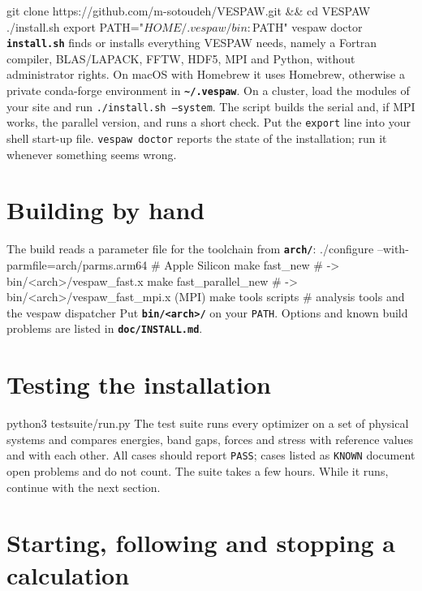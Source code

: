 \documentclass[11pt,a4paper,oneside]{book}
\newcommand{\file}[1]{\textbf{\texttt{#1}}}
\newenvironment{shell}{\small\verbatim}{\endverbatim}
\begin{document}
\begin{shell}
git clone https://github.com/m-sotoudeh/VESPAW.git && cd VESPAW
./install.sh
export PATH="$HOME/.vespaw/bin:$PATH"
vespaw doctor
\end{shell}
\file{install.sh} finds or installs everything VESPAW needs, namely a
Fortran compiler, BLAS/LAPACK, FFTW, HDF5, MPI and Python, without
administrator rights. On macOS with Homebrew it uses Homebrew, otherwise
a private conda-forge environment in \file{\textasciitilde/.vespaw}. On
a cluster, load the modules of your site and run
\texttt{./install.sh --system}. The script builds the serial and, if MPI
works, the parallel version, and runs a short check. Put the
\texttt{export} line into your shell start-up file. \texttt{vespaw
doctor} reports the state of the installation; run it whenever
something seems wrong.

\section{Building by hand}

The build reads a parameter file for the toolchain from \file{arch/}:
\begin{shell}
./configure --with-parmfile=arch/parms.arm64     # Apple Silicon
make fast_new             # -> bin/<arch>/vespaw_fast.x
make fast_parallel_new    # -> bin/<arch>/vespaw_fast_mpi.x (MPI)
make tools scripts        # analysis tools and the vespaw dispatcher
\end{shell}
Put \file{bin/<arch>/} on your \texttt{PATH}. Options and known build
problems are listed in \file{doc/INSTALL.md}.

\section{Testing the installation}

\begin{shell}
python3 testsuite/run.py
\end{shell}
The test suite runs every optimizer on a set of physical systems and
compares energies, band gaps, forces and stress with reference values
and with each other. All cases should report \texttt{PASS}; cases
listed as \texttt{KNOWN} document open problems and do not count. The
suite takes a few hours. While it runs, continue with the next section.

\section{Starting, following and stopping a calculation}
\end{document}
